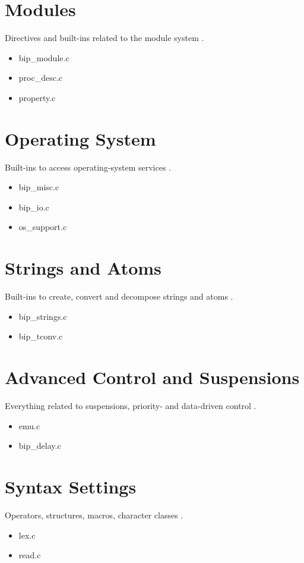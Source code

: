 \section{Modules }
     Directives and built-ins related to the module system .
     \begin{itemize}
     \item bip_module.c
     \item proc_desc.c
     \item property.c
     \end{itemize}

\section{Operating System }
     Built-ins to access operating-system services .
     \begin{itemize}
     \item bip_misc.c
     \item bip_io.c
     \item os_support.c
     \end{itemize}

\section{Strings and Atoms }
     Built-ins to create, convert and decompose strings and atoms .
     \begin{itemize}
     \item bip_strings.c
     \item bip_tconv.c
     \end{itemize}

\section{Advanced Control and Suspensions }
     Everything related to suspensions, priority- and data-driven control .
     \begin{itemize}
     \item emu.c
     \item bip_delay.c
     \end{itemize}

\section{Syntax Settings }
     Operators, structures, macros, character classes .
     \begin{itemize}
     \item lex.c
     \item read.c
     \end{itemize}

